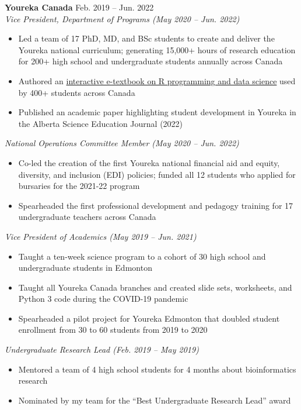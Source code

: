 \documentclass{article}
\begin{document}
\textbf{Youreka Canada} \hfill Feb. 2019 -- Jun. 2022 \\
\textit{Vice President, Department of Programs (May 2020 -- Jun. 2022)}
\begin{itemize}
    \item Led a team of 17 PhD, MD, and BSc students to create and deliver the Youreka national curriculum; generating 15,000+ hours of research education for 200+ high school and undergraduate students annually across Canada
    \item Authored an \href{https://youreka-textbook.netlify.app/}{interactive e-textbook on R programming and data science} used by 400+ students across Canada
    \item Published an academic paper highlighting student development in Youreka in the Alberta Science Education Journal (2022)
\end{itemize} \vspace{1em}
\textit{National Operations Committee Member (May 2020 -- Jun. 2022)}
\begin{itemize}
    \item Co-led the creation of the first Youreka national financial aid and equity, diversity, and inclusion (EDI) policies; funded all 12 students who applied for bursaries for the 2021-22 program
    \item Spearheaded the first professional development and pedagogy training for 17 undergraduate teachers across Canada
\end{itemize} \vspace{1em}
\textit{Vice President of Academics (May 2019 -- Jun. 2021)}
\begin{itemize}
    \item Taught a ten-week science program to a cohort of 30 high school and undergraduate students in Edmonton
    \item Taught all Youreka Canada branches and created slide sets, worksheets, and Python 3 code during the COVID-19 pandemic
    \item Spearheaded a pilot project for Youreka Edmonton that doubled student enrollment from 30 to 60 students from 2019 to 2020
\end{itemize} \vspace{1em}
\textit{Undergraduate Research Lead (Feb. 2019 -- May 2019)}
\begin{itemize}
    \item Mentored a team of 4 high school students for 4 months about bioinformatics research
    \item Nominated by my team for the ``Best Undergraduate Research Lead'' award
\end{itemize} \vspace{1em}
\end{document}
